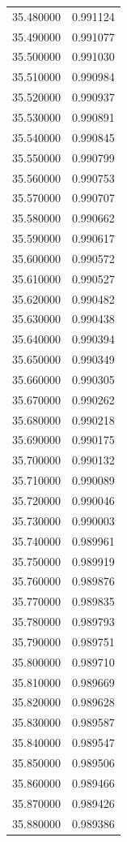 \begin{tabular}{rr}
35.480000 & 0.991124 \\
35.490000 & 0.991077 \\
35.500000 & 0.991030 \\
35.510000 & 0.990984 \\
35.520000 & 0.990937 \\
35.530000 & 0.990891 \\
35.540000 & 0.990845 \\
35.550000 & 0.990799 \\
35.560000 & 0.990753 \\
35.570000 & 0.990707 \\
35.580000 & 0.990662 \\
35.590000 & 0.990617 \\
35.600000 & 0.990572 \\
35.610000 & 0.990527 \\
35.620000 & 0.990482 \\
35.630000 & 0.990438 \\
35.640000 & 0.990394 \\
35.650000 & 0.990349 \\
35.660000 & 0.990305 \\
35.670000 & 0.990262 \\
35.680000 & 0.990218 \\
35.690000 & 0.990175 \\
35.700000 & 0.990132 \\
35.710000 & 0.990089 \\
35.720000 & 0.990046 \\
35.730000 & 0.990003 \\
35.740000 & 0.989961 \\
35.750000 & 0.989919 \\
35.760000 & 0.989876 \\
35.770000 & 0.989835 \\
35.780000 & 0.989793 \\
35.790000 & 0.989751 \\
35.800000 & 0.989710 \\
35.810000 & 0.989669 \\
35.820000 & 0.989628 \\
35.830000 & 0.989587 \\
35.840000 & 0.989547 \\
35.850000 & 0.989506 \\
35.860000 & 0.989466 \\
35.870000 & 0.989426 \\
35.880000 & 0.989386 \\

\end{tabular}

